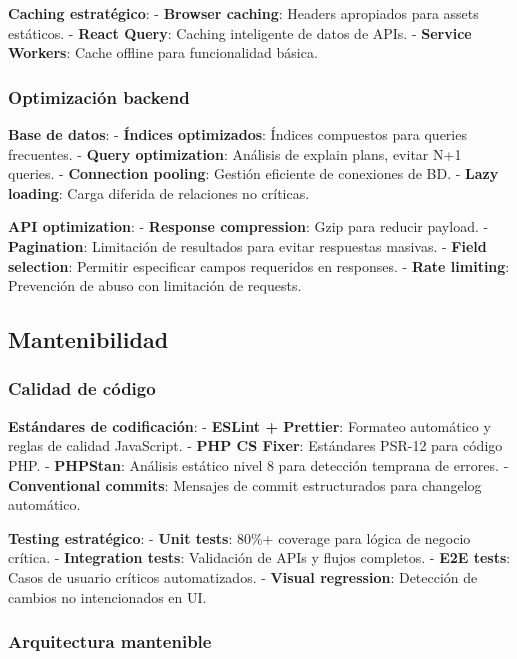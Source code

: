 \documentclass[12pt,a4paper,oneside]{report}
\begin{document}
\textbf{Caching estratégico}: - \textbf{Browser caching}: Headers
apropiados para assets estáticos. - \textbf{React Query}: Caching
inteligente de datos de APIs. - \textbf{Service Workers}: Cache offline
para funcionalidad básica.

\subsubsection{Optimización backend}\label{optimizaciuxf3n-backend}

\textbf{Base de datos}: - \textbf{Índices optimizados}: Índices
compuestos para queries frecuentes. - \textbf{Query optimization}:
Análisis de explain plans, evitar N+1 queries. - \textbf{Connection
pooling}: Gestión eficiente de conexiones de BD. - \textbf{Lazy
loading}: Carga diferida de relaciones no críticas.

\textbf{API optimization}: - \textbf{Response compression}: Gzip para
reducir payload. - \textbf{Pagination}: Limitación de resultados para
evitar respuestas masivas. - \textbf{Field selection}: Permitir
especificar campos requeridos en responses. - \textbf{Rate limiting}:
Prevención de abuso con limitación de requests.

\subsection{Mantenibilidad}\label{mantenibilidad-1}

\subsubsection{Calidad de código}\label{calidad-de-cuxf3digo}

\textbf{Estándares de codificación}: - \textbf{ESLint + Prettier}:
Formateo automático y reglas de calidad JavaScript. - \textbf{PHP CS
Fixer}: Estándares PSR-12 para código PHP. - \textbf{PHPStan}: Análisis
estático nivel 8 para detección temprana de errores. -
\textbf{Conventional commits}: Mensajes de commit estructurados para
changelog automático.

\textbf{Testing estratégico}: - \textbf{Unit tests}: 80\%+ coverage para
lógica de negocio crítica. - \textbf{Integration tests}: Validación de
APIs y flujos completos. - \textbf{E2E tests}: Casos de usuario críticos
automatizados. - \textbf{Visual regression}: Detección de cambios no
intencionados en UI.

\subsubsection{Arquitectura mantenible}\label{arquitectura-mantenible}
\end{document}
